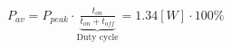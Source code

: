 \documentclass[preview]{standalone}
\begin{document}
\begin{center}
$P_{av} = P_{peak} \cdot \underbrace{\frac{t_{on}}{t_{on}+t_{off}}}_{\text{Duty cycle}}=$$1.34 [W] \cdot 100 \%$
\end{center}
\end{document}
